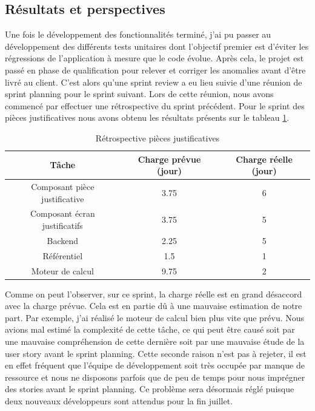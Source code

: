 \subsection{Résultats et perspectives}

	Une fois le développement des fonctionnalités terminé, j'ai pu passer au développement des différents tests unitaires dont l'objectif premier est d'éviter les régressions de l'application à mesure que le code évolue. Après cela, le projet est passé en phase de qualification pour relever et corriger les anomalies avant d'être livré au client. C'est alors qu'une sprint review a eu lieu suivie d'une réunion de sprint planning pour le sprint suivant. Lors de cette réunion, nous avons commencé par effectuer une rétrospective du sprint précédent. Pour le sprint des pièces justificatives nous avons obtenu les résultats présents sur le tableau \ref{retroPJ}.

\begin{table}[h!]
	\center
	\begin{tabular}{| c | c | c |}
     \hline
     Tâche & Charge prévue (jour) & Charge réelle (jour) \\ \hline
     Composant pièce justificative & 3.75 & 6\\ \hline
     Composant écran justificatifs & 3.75 & 5\\ \hline
     Backend & 2.25 & 5\\ \hline
     Référentiel & 1.5 & 1\\ \hline
     Moteur de calcul & 9.75 & 2\\
     \hline
	\end{tabular}
	\caption{Rétrospective pièces justificatives}
	\label{retroPJ}
\end{table}
	
	Comme on peut l'observer, sur ce sprint, la charge réelle est en grand désaccord avec la charge prévue. Cela est en partie dû à une mauvaise estimation de notre part. Par exemple, j'ai réalisé le moteur de calcul bien plus vite que prévu. Nous avions mal estimé la complexité de cette tâche, ce qui peut être causé soit par une mauvaise compréhension de cette dernière soit par une mauvaise étude de la user story avant le sprint planning. Cette seconde raison n'est pas à rejeter, il est en effet fréquent que l'équipe de développement soit très occupée par manque de ressource et nous ne disposons parfois que de peu de temps pour nous imprégner des stories avant le sprint planning. Ce problème sera désormais réglé puisque deux nouveaux développeurs sont attendus pour la fin juillet. \\
	
